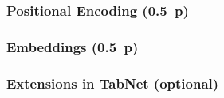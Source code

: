 
\subsubsection{Positional Encoding (0.5~p)}\label{sec:positional-encoding}

\subsubsection{Embeddings (0.5~p)}\label{sec:embeddings}

\subsubsection{Extensions in TabNet (optional)}\label{sec:extensions-in-tabnet}

